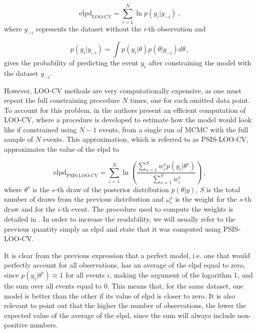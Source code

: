 \begin{equation}
    \text{elpd}_\text{LOO-CV} = \sum_{i=1}^N \ln p(y_i|y_{-i}) \,,
\end{equation}
where $y_{-i}$ represents the dataset without the $i$-th observation and

\begin{equation}
    p(y_i|y_{-i}) = \int p(y_i|\theta) p(\theta|y_{-i}) d\theta \,,
\end{equation}
gives the probability of predicting the event $y_i$ after constraining the model with the dataset $y_{-i}$.

However, \gls{LOO-CV} methods are very computationally expensive, as one must repeat the full constraining procedure $N$ times, one for each omitted data point. To account for this problem, in \cite{Vehtari2015} the authors present an efficient computation of \gls{LOO-CV}, where a procedure is developed to estimate how the model would look like if constrained using $N - 1$ events, from a single run of \gls{MCMC} with the full sample of $N$ events. This approximation, which is referred to as \gls{PSIS-LOO-CV}, approximates the value of the \gls{elpd} to

\begin{equation}
    \label{eq:elpd_PSIS-LOO-CV}
    \text{elpd}_\text{PSIS-LOO-CV} = \sum_{i=1}^N \ln \left(\frac{\sum_{s=1}^S w_i^s p(y_i|\theta^s)}{\sum_{s=1}^S w_i^s}\right) \,,
\end{equation}
where $\theta^s$ is the $s$-th draw of the posterior distribution $p(\theta|y)$, $S$ is the total number of draws from the previous distribution and $\omega_i^s$ is the weight for the $s$-th draw and for the $i$-th event. The procedure used to compute the weights is detailed in \cite{Vehtari2015}. In order to increase the readability, we will usually refer to the previous quantity simply as \gls{elpd} and state that it was computed using \gls{PSIS-LOO-CV}.

It is clear from the previous expression that a perfect model, i.e. one that would perfectly account for all observations, has an average of the \gls{elpd} equal to zero, since $p(y_i|\theta^s) \approx 1$ for all events $i$, making the argument of the logarithm 1, and the sum over all events equal to 0. This means that, for the same dataset, one model is better than the other if its value of \gls{elpd} is closer to zero. It is also relevant to point out that the  higher the number of observations, the lower the expected value of the average of the \gls{elpd}, since the sum will always include non-positive numbers.

